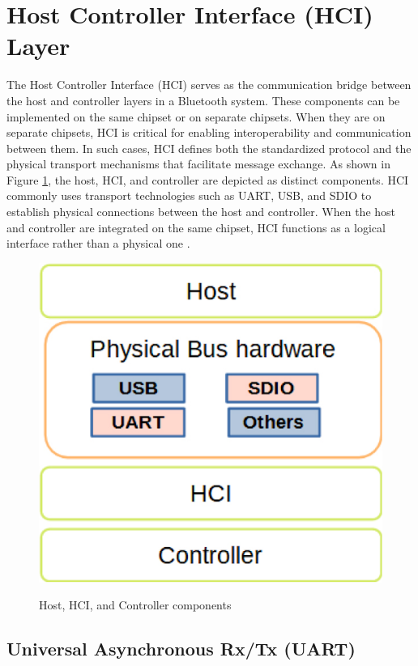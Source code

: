\section{Host Controller Interface (HCI) Layer}

The Host Controller Interface (HCI) serves as the communication bridge between the host and controller layers in a Bluetooth system. These components can be implemented on the same chipset or on separate chipsets. When they are on separate chipsets, HCI is critical for enabling interoperability and communication between them. In such cases, HCI defines both the standardized protocol and the physical transport mechanisms that facilitate message exchange. As shown in Figure \ref{fig:hosthcicontroller}, the host, HCI, and controller are depicted as distinct components. HCI commonly uses transport technologies such as UART, USB, and SDIO to establish physical connections between the host and controller. When the host and controller are integrated on the same chipset, HCI functions as a logical interface rather than a physical one \cite{introtoble}.

\begin{figure}[h]
    \caption{Host, HCI, and Controller components}
    \includegraphics[scale=.6]{hosthcicontroller.png}
    \label{fig:hosthcicontroller}
    \end{figure}

\subsection{Universal Asynchronous Rx/Tx (UART)}


